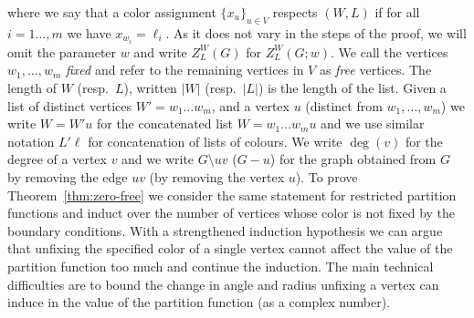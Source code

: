 where we say that a color assignment $\{x_u\}_{u\in V}$ respects $(W,L)$ if for all $i=1\ldots, m$ we have $x_{w_i}=\ell_i$.
As it does not vary in the steps of the proof, we will omit the parameter $w$ and write $Z^W_L(G)$ for $Z^W_L(G;w)$.
We call the vertices $w_1,\ldots,w_m$ \emph{fixed} and refer to the remaining vertices in $V$ as \emph{free} vertices. The length of $W$ (resp.\ $L$), written $|W|$ (resp.\ $|L|$) is the length of the list.
Given a list of distinct vertices $W' = w_1\ldots w_m$, and a vertex $u$ (distinct from $w_1, \ldots, w_m$) we write $W = W'u$ for the concatenated list $W = w_1\ldots w_m u$ and we use similar notation $L'\ell$ for concatenation of lists of colours.  We write $\deg(v)$ for the degree of a vertex $v$ and we write $G\setminus uv$ ($G-u$) for the graph obtained from $G$ by removing the edge $uv$ (by removing the vertex $u$). 
%
%
%
To prove Theorem~\ref{thm:zero-free} we consider the same statement for restricted partition functions and induct over the number of vertices whose color is not fixed by the boundary conditions.
With a strengthened induction hypothesis we can argue that unfixing the specified color of a single vertex cannot affect the value of the partition function too much and continue the induction. 
The main technical difficulties are to bound the change in angle and radius unfixing a vertex can induce in the value of the partition function (as a complex number). 
%
